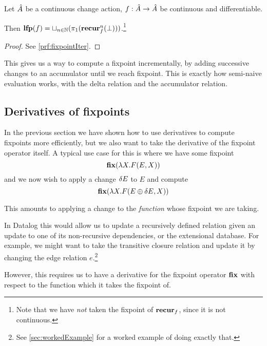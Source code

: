 \begin{thm}[name=Incremental computation of least fixpoints, restate=fixpointIter]
\label{thm:fixpointIter}
  Let $\hat{A}$ be a continuous change action, $f: \hat{A} \rightarrow
  \hat{A}$ be continuous and differentiable.

  Then $\mathbf{lfp}(f) = \sqcup_{n \in \mathbb{N}}(\pi_1(\mathbf{recur}_f^n(\bot)))$.\footnote{
    Note that we have \emph{not} taken the fixpoint of $\mathbf{recur}_f$, since it is
    not continuous.}
\end{thm}
\ifproofs
\begin{proof}
  See \cref{prf:fixpointIter}.
\end{proof}
\fi

This gives us a way to compute a fixpoint incrementally, by adding successive
changes to an accumulator until we reach fixpoint. This is exactly how
semi-naive evaluation works, with the delta relation and the accumulator relation.

\subsection{Derivatives of fixpoints}
\label{sec:fixpointDerivatives}

In the previous section we have shown how to use derivatives to compute fixpoints
more efficiently, but we also want to take the derivative of the fixpoint
operator itself. A typical use case for this is where we have some fixpoint
\begin{displaymath}
  \mathbf{fix} (\lambda X . F(E, X))
\end{displaymath}
and we now wish to apply a change $\delta E$ to $E$ and compute
\begin{displaymath}
  \mathbf{fix} (\lambda X . F(E \oplus \delta E, X))
\end{displaymath}

This amounts to applying a change to the \emph{function} whose fixpoint we are taking.

In Datalog this would allow us to update a recursively defined relation given an
update to one of its non-recursive dependencies, or the extensional database.
For example, we might want to take the transitive closure relation
and update it by changing the edge relation $e$.\footnote{See
  \cref{sec:workedExample} for a worked example of doing exactly that.}

However, this requires us to have a derivative for the fixpoint operator
$\mathbf{fix}$ with respect to the function which it takes the fixpoint of.


